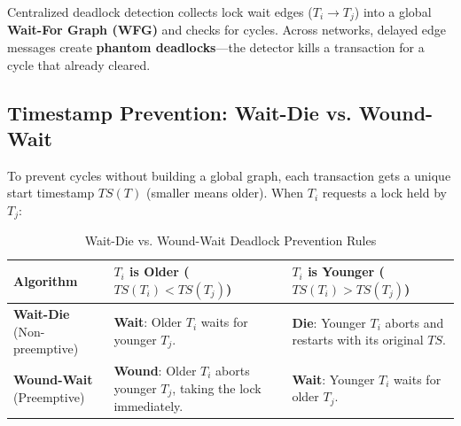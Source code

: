 Centralized deadlock detection collects lock wait edges ($T_i \to T_j$) into a global \textbf{Wait-For Graph (WFG)} and checks for cycles. Across networks, delayed edge messages create \textbf{phantom deadlocks}---the detector kills a transaction for a cycle that already cleared.

\subsection{Timestamp Prevention: Wait-Die vs. Wound-Wait}

To prevent cycles without building a global graph, each transaction gets a unique start timestamp $TS(T)$ (smaller means older). When $T_i$ requests a lock held by $T_j$:

\begin{table}[htbp]
\centering\small
\begin{tabular}{lp{5.8cm}p{5.8cm}}
\toprule
\textbf{Algorithm} & \textbf{$T_i$ is Older ($TS(T_i) < TS(T_j)$)} & \textbf{$T_i$ is Younger ($TS(T_i) > TS(T_j)$)} \\
\midrule
\textbf{Wait-Die} (Non-preemptive) & \textbf{Wait}: Older $T_i$ waits for younger $T_j$. & \textbf{Die}: Younger $T_i$ aborts and restarts with its original $TS$. \\
\textbf{Wound-Wait} (Preemptive) & \textbf{Wound}: Older $T_i$ aborts younger $T_j$, taking the lock immediately. & \textbf{Wait}: Younger $T_i$ waits for older $T_j$. \\
\bottomrule
\end{tabular}
\caption{Wait-Die vs. Wound-Wait Deadlock Prevention Rules}
\label{tab:v4-ch03-deadlock-algos}
\end{table}

